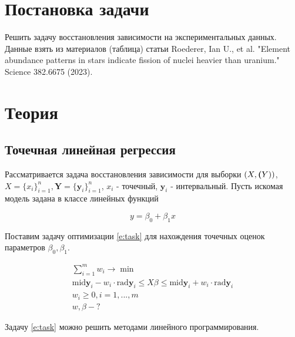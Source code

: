 \documentclass[a4paper,12pt]{article}
\begin{document}
    
    \newpage

    \tableofcontents
    \listoffigures
    \newpage

    \section{Постановка задачи}

    \quad Решить задачу восстановления зависимости на экспериментальных данных.
    Данные взять из материалов (таблица) статьи Roederer, Ian U., et al. "Element abundance patterns in stars indicate fission of nuclei heavier than uranium." Science 382.6675 (2023).

    \section{Теория}
    \subsection{Точечная линейная регрессия}
    \quad Рассматривается задача восстановления зависимости для выборки
    $ (X, \textbf(Y))$, $ X = \{x_i\}_{i=1}^{n}, \textbf{Y} = \{\textbf{y}_i\}_{i=1}^{n} $,
    $ x_i $ - точечный, $ \textbf{y}_i $ - интервальный.
    Пусть искомая модель задана в классе линейных функций

    \label{e:model}
    \begin{equation}
        y = \beta_0 + \beta_1 x
    \end{equation}

    Поставим задачу оптимизации \ref{e:task} для нахождения точечных оценок
    параметров $ \beta_0, \beta_1 $.

    \label{e:task}
    \begin{equation}
        \begin{gathered}
            \sum_{i = 1}^{m}w_{i} \to \min \\
            \text{mid}\textbf{y}_{i} - w_{i} \cdot \text{rad}\textbf{y}_{i} \leq X\beta \leq \text{mid}\textbf{y}_{i} + w_{i} \cdot \text{rad}\textbf{y}_{i} \\
            w_{i} \geq 0, i = 1, ..., m \\
            w, \beta - ?
        \end{gathered}
    \end{equation}
    
    Задачу \ref{e:task} можно решить методами линейного программирования.
\end{document}
